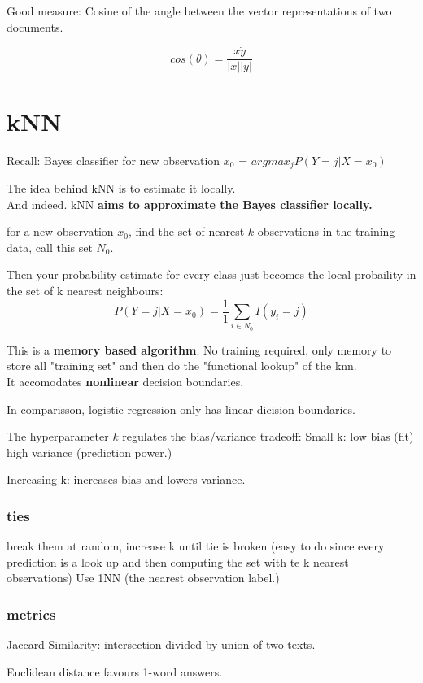 \documentclass{article}
\begin{document}
Good measure: Cosine of the angle between the vector representations of two documents. 

\[
cos(\theta) = \frac{x \dot y}{|x||y|}
\]

\section{kNN}
Recall: Bayes classifier for new observation $x_0$ = $argmax_j P (Y=j|X=x_0)$

The idea behind kNN is to estimate it locally. \\

And indeed. kNN \textbf{aims to approximate the Bayes classifier locally.}

for a new observation $x_0$, find the set of nearest $k$ observations in the training data, call this set $N_0$.

Then your probability estimate for every class just becomes the local probaility in the set of k nearest neighbours: 
\[
P(Y=j| X=x_0 ) = \frac{1}{1} \sum_{i \in N_0} I(y_i =j)
\]

This is a \textbf{memory based algorithm}. No training required, only memory to store all "training set" and then do the "functional lookup" of the knn. \\

It accomodates \textbf{nonlinear} decision boundaries. 

In comparisson, logistic regression only has linear dicision boundaries. 

The hyperparameter $k$ regulates the bias/variance tradeoff:
Small k: low bias (fit) high variance (prediction power.) 

Increasing k: increases bias and lowers variance. 

\subsubsection{ties}
break them at random, increase k until tie is broken (easy to do since every prediction is a look up and  then computing the set with te k nearest observations) Use 1NN (the nearest observation label.)


\subsubsection{metrics}
Jaccard Similarity: intersection divided by union of two texts.

Euclidean distance favours 1-word answers.
\end{document}
